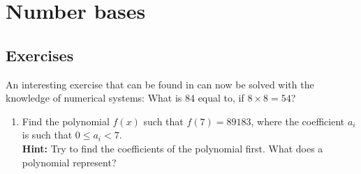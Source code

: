 \documentclass[11pt,a4paper]{book}
\author{Artem Los}
\begin{document}
\chapter{Number bases}

\section{Exercises}
An interesting exercise that can be found in \cite[p.49]{Pelerman1} can now be solved with the knowledge of numerical systems:
What is $84$ equal to, if $8\times 8 =54$?

\begin{enumerate}

\item Find the polynomial $f(x)$ such that $f(7)=89183$, where the coefficient $a_i$ is such that $0 \le a_i < 7$.\\
\textbf{Hint:} Try to find the coefficients of the polynomial first. What does a polynomial represent?
\end{enumerate}






\cite{From2To16}
\cite{Concrete}
\cite{Pelerman1}
\cite{Khan1}
\cite{TrickBook}








\end{document}
